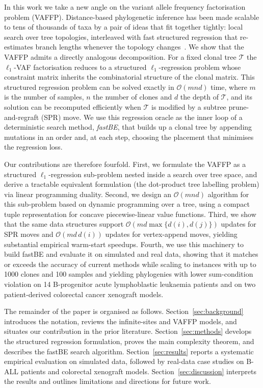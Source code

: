 \documentclass[11pt]{article}
\begin{document}
In this work we take a new angle on the variant allele frequency factorisation problem (VAFFP). Distance-based phylogenetic inference has been made scalable to tens of thousands of taxa by a pair of ideas that fit together tightly: local search over tree topologies, interleaved with fast structured regression that re-estimates branch lengths whenever the topology changes~\citep{desper2002fastme,lefort2015fastme,price2010fasttree}. We show that the VAFFP admits a directly analogous decomposition. For a fixed clonal tree $\mathcal{T}$ the $\ell_1$-VAF factorisation reduces to a structured $\ell_1$-regression problem whose constraint matrix inherits the combinatorial structure of the clonal matrix. This structured regression problem can be solved exactly in $\mathcal{O}(mnd)$ time, where $m$ is the number of samples, $n$ the number of clones and $d$ the depth of $\mathcal{T}$, and its solution can be recomputed efficiently when $\mathcal{T}$ is modified by a subtree prune-and-regraft (SPR) move. We use this regression oracle as the inner loop of a deterministic search method, \emph{fastBE}, that builds up a clonal tree by appending mutations in an order and, at each step, choosing the placement that minimises the regression loss.

Our contributions are therefore fourfold. First, we formulate the VAFFP as a structured $\ell_1$-regression sub-problem nested inside a search over tree space, and derive a tractable equivalent formulation (the dot-product tree labelling problem) via linear programming duality. Second, we design an $\mathcal{O}(mnd)$ algorithm for this sub-problem based on dynamic programming over a tree, using a compact tuple representation for concave piecewise-linear value functions. Third, we show that the same data structures support $\mathcal{O}(md\max\{d(i),d(j)\})$ updates for SPR moves and $\mathcal{O}(md\,d(i))$ updates for vertex-append moves, yielding substantial empirical warm-start speedups. Fourth, we use this machinery to build fastBE and evaluate it on simulated and real data, showing that it matches or exceeds the accuracy of current methods while scaling to instances with up to 1000 clones and 100 samples and yielding phylogenies with lower sum-condition violation on 14 B-progenitor acute lymphoblastic leukaemia patients and on two patient-derived colorectal cancer xenograft models.

The remainder of the paper is organised as follows. Section~\ref{sec:background} introduces the notation, reviews the infinite-sites and VAFFP models, and situates our contribution in the prior literature. Section~\ref{sec:methods} develops the structured regression formulation, proves the main complexity theorem, and describes the fastBE search algorithm. Section~\ref{sec:results} reports a systematic empirical evaluation on simulated data, followed by real-data case studies on B-ALL patients and colorectal xenograft models. Section~\ref{sec:discussion} interprets the results and outlines limitations and directions for future work.
\end{document}
